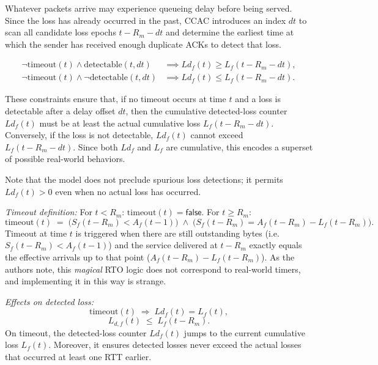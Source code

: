 \documentclass[12pt]{l4dc2023}
\begin{document}
Whatever packets arrive may experience queueing delay before being served.  Since the loss has already occurred in the past, CCAC introduces an index \(dt\) to scan all candidate loss epochs \(t - R_m - dt\) and determine the earliest time at which the sender has received enough duplicate ACKs to detect that loss.

\[
\begin{aligned}
\neg\mathrm{timeout}(t)\land \mathrm{detectable}(t,dt)
&\implies Ld_f(t)\ge L_f(t-R_m-dt),\\
\neg\mathrm{timeout}(t)\land \neg\mathrm{detectable}(t,dt)
&\implies Ld_f(t)\le L_f(t-R_m-dt).
\end{aligned}
\]

These constraints ensure that, if no timeout occurs at time \(t\) and a loss is detectable after a delay offset $dt$, then the cumulative detected-loss counter $Ld_{f}(t)$ must be at least the actual cumulative loss $L_f(t-R_m-dt)$.  Conversely, if the loss is not detectable, \(Ld_{f}(t)\) cannot exceed $L_f(t-R_m-dt)$.  Since both \(Ld_{f}\) and \(L_f\) are cumulative, this encodes a superset of possible real-world behaviors.

Note that the model does not preclude spurious loss detections; it permits \(Ld_{f}(t)>0\) even when no actual loss has occurred.  

\emph{Timeout definition:}
For \(t< R_m\): $\mathrm{timeout}(t) = \mathsf{false}.$ For \(t \ge R_m\): 
\[
\mathrm{timeout}(t) \;=\; 
\bigl(S_f(t-R_m) < A_f(t-1)\bigr)
\;\wedge\;
\bigl(S_f(t-R_m) = A_f(t-R_m) - L_f(t-R_m)\bigr).
\]
Timeout at time \(t\) is triggered when there are still outstanding bytes (i.e.\ \(S_f(t-R_m) < A_f(t-1)\)) and the service delivered at \(t-R_m\) exactly equals the effective arrivals up to that point (\(A_f(t-R_m) - L_f(t-R_m)\)).  
As the authors note, this \textit{magical} RTO logic does not correspond to real-world timers, and implementing it in this way is strange. 

\emph{Effects on detected loss:}
\[
\mathrm{timeout}(t)\;\Longrightarrow\; Ld_{f}(t) = L_f(t),
\]
\[
L_{d,f}(t)\;\le\;L_f(t-R_m).
\]
On timeout, the detected-loss counter \(Ld_{f}(t)\) jumps to the current cumulative loss \(L_f(t)\). Moreover, it ensures detected losses never exceed the actual losses that occurred at least one RTT earlier.
\end{document}
